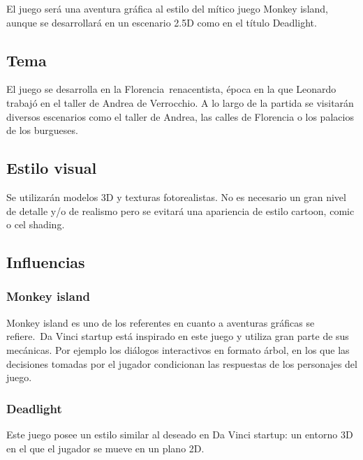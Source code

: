 {
El juego ser\'a una aventura gr\'afica al estilo del m\'itico juego Monkey island, aunque se desarrollar\'a en un
escenario 2.5D como en el t\'itulo Deadlight.}

\subsection[Tema]{ Tema}
\hypertarget{Toc484614210}{}{
El juego se desarrolla en la Florencia\ renacentista, \'epoca en la que Leonardo trabaj\'o en el taller de Andrea de
Verrocchio. A lo largo de la partida se visitar\'an diversos escenarios como el taller de Andrea, las calles de
Florencia o los palacios de los burgueses.}

\subsection[Estilo visual]{ Estilo visual}
\hypertarget{Toc484614211}{}{
Se utilizar\'an modelos 3D y texturas fotorealistas. No es necesario un gran nivel de detalle y/o de realismo pero se
evitar\'a una apariencia de estilo cartoon, comic o cel shading.}

\subsection[Influencias]{ Influencias}
\hypertarget{Toc484614212}{}\subsubsection[Monkey island]{ Monkey island}
\hypertarget{Toc484614213}{}{
Monkey island es uno de los referentes en cuanto a aventuras gr\'aficas se refiere.\ Da Vinci startup est\'a inspirado
en este juego y utiliza gran parte de sus mec\'anicas. Por ejemplo los di\'alogos interactivos en formato \'arbol, en
los que las decisiones tomadas por el jugador condicionan las respuestas de los personajes del juego.}

\subsubsection[Deadlight]{ Deadlight}
\hypertarget{Toc484614214}{}{
Este juego posee un estilo similar al deseado en Da Vinci startup: un entorno 3D en el que el jugador se mueve en un
plano 2D.}

